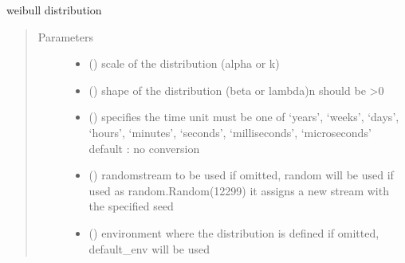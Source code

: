 \documentclass[letterpaper,10pt,english]{sphinxmanual}
\begin{document}

\begin{fulllineitems}
\label{\detokenize{Reference:salabim.Weibull}}
weibull distribution
\begin{quote}\begin{description}
\item[{Parameters}] \leavevmode\begin{itemize}
\item {} 
 () \textendash{} scale of the distribution (alpha or k)

\item {} 
 () \textendash{} shape of the distribution (beta or lambda)\textbar{}n\textbar{}
should be \textgreater{}0

\item {} 
 () \textendash{} specifies the time unit 
must be one of ‘years’, ‘weeks’, ‘days’, ‘hours’, ‘minutes’, ‘seconds’, ‘milliseconds’, ‘microseconds’ 
default : no conversion 

\item {} 
 () \textendash{} randomstream to be used 
if omitted, random will be used 
if used as random.Random(12299)
it assigns a new stream with the specified seed

\item {} 
 ({\hyperref[\detokenize{Reference:salabim.Environment}]{}}) \textendash{} environment where the distribution is defined 
if omitted, default\_env will be used

\end{itemize}

\end{description}\end{quote}


\end{fulllineitems}
\end{document}
